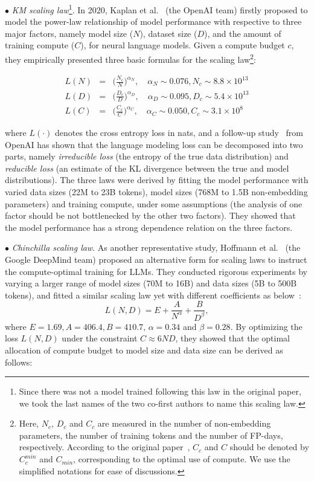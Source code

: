 $\bullet$ \emph{KM scaling law}\footnote{Since there was not a model trained following this law in the original paper, we took the last names of the two co-first authors to name this scaling law. 
}. In 2020, Kaplan et al.~\cite{Kaplan-arxiv-2020-Scaling} (the OpenAI team) firstly proposed to model the power-law relationship of model performance with respective to three major factors, namely model size ($N$), dataset size ($D$), and the amount of training compute ($C$), for neural language models. Given a compute budget $c$, they empirically presented three basic formulas for the scaling law\footnote{Here, $N_c$, $D_c$ and $C_c$ are measured in the number of non-embedding parameters, the number of training tokens and the number of FP-days, respectively. According to the original paper~\cite{Kaplan-arxiv-2020-Scaling}, $C_c$ and $C$ should be denoted by $C_c^{min}$ and $C_{min}$, corresponding to the optimal use of compute. We use the simplified notations for ease of discussions. }: 

\begin{eqnarray}
L(N) &=& \bigg(\frac{N_c}{N}\bigg)^{\alpha_N}, \text{~~~} \alpha_N \sim 0.076, N_c \sim 8.8\times 10^{13} \\\nonumber
L(D) &=& \bigg(\frac{D_c
}{D}\bigg)^{\alpha_D},  \text{~~~} \alpha_D \sim 0.095, D_c \sim 5.4\times 10^{13} \\\nonumber
L(C) &=& \bigg(\frac{C_c}{C}\bigg)^{\alpha_C},  \text{~~~} \alpha_C \sim 0.050, C_c \sim 3.1\times 10^{8}\nonumber
\end{eqnarray}

\noindent where $L(\cdot)$ denotes  the cross entropy loss in nats, and a follow-up study~\cite{Henighan-2020-scalinglaw} from OpenAI has shown that the language modeling loss can be decomposed into two parts, namely \emph{irreducible loss} (the entropy of the true data distribution) and \emph{reducible loss} (an estimate of the KL divergence between the true and model distributions). The three laws were derived by fitting the model performance with varied data sizes (22M to 23B tokens), model sizes  (768M to 1.5B non-embedding parameters) and training compute, under some assumptions (\eg the analysis of one factor should be not bottlenecked by the other two factors). They showed that the model performance has a strong dependence relation on the three factors. 

$\bullet$ \emph{Chinchilla scaling law}. As another representative study,  Hoffmann et al.~\cite{Hoffmann-arxiv-2022-Training} (the Google DeepMind team) 
proposed an alternative form for scaling laws to instruct the compute-optimal training for LLMs. They conducted rigorous  experiments by varying a larger range of model sizes (70M to 16B) and data sizes (5B to 500B tokens), and fitted a similar scaling law yet with different coefficients  as below~\cite{Hoffmann-arxiv-2022-Training}:
 \begin{equation}
L(N, D) = E + \frac{A}{N^\alpha} + \frac{B}{D^{\beta}},
\end{equation}
where $E = 1.69, A = 406.4, B = 410.7$, $\alpha=0.34$ and $\beta=0.28$. By optimizing the loss $L(N, D)$ under the constraint $C\approx 6ND$, they showed that  the optimal  allocation of compute budget to model size and data size can be  derived as follows: 


